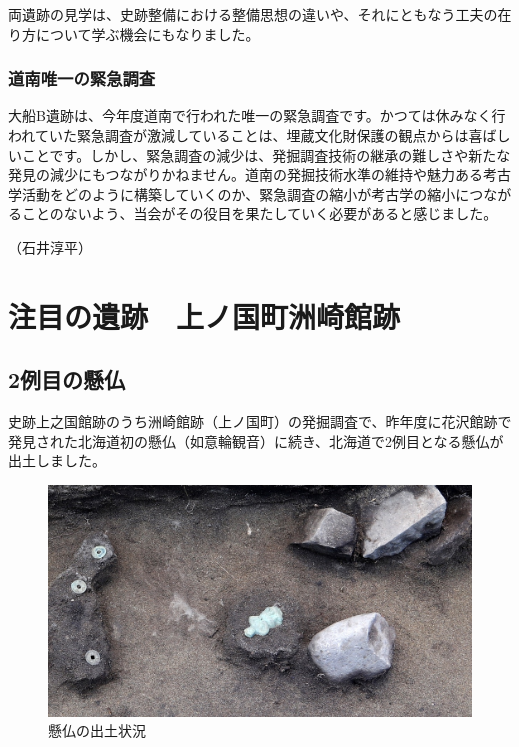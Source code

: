 \documentclass[a4j,11pt,twocolumn,openany]{jsbook}
\begin{document}
両遺跡の見学は、史跡整備における整備思想の違いや、それにともなう工夫の在り方について学ぶ機会にもなりました。

\subsection{道南唯一の緊急調査}
大船B遺跡は、今年度道南で行われた唯一の緊急調査です。かつては休みなく行われていた緊急調査が激減していることは、埋蔵文化財保護の観点からは喜ばしいことです。しかし、緊急調査の減少は、発掘調査技術の継承の難しさや新たな発見の減少にもつながりかねません。道南の発掘技術水準の維持や魅力ある考古学活動をどのように構築していくのか、緊急調査の縮小が考古学の縮小につながることのないよう、当会がその役目を果たしていく必要があると感じました。

\begin{flushright}
	（石井淳平）
\end{flushright}


\chapter{注目の遺跡　上ノ国町洲崎館跡　}

\section{2例目の懸仏}

史跡上之国館跡のうち洲崎館跡（上ノ国町）の発掘調査で、昨年度に花沢館跡で発見された北海道初の懸仏（如意輪観音）に続き、北海道で2例目となる懸仏が出土しました。

\begin{figure}[ht]
	\centering
	\includegraphics[width=\linewidth]{fig/08_Tukada/02shutudo.JPG}
	\caption{懸仏の出土状況}
	\label{}
	\vspace{-\baselineskip}
\end{figure}
\end{document}

